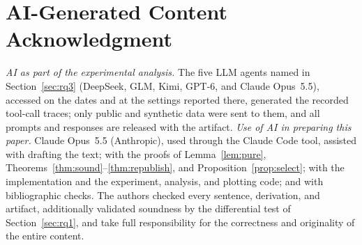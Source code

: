 \documentclass[sigconf, nonacm]{acmart}
\begin{document}
\section*{AI-Generated Content Acknowledgment}
\emph{AI as part of the experimental analysis.} The five LLM agents named in Section~\ref{sec:rq3} (DeepSeek, GLM, Kimi, GPT-6, and Claude Opus~5.5), accessed on the dates and at the settings reported there, generated the recorded tool-call traces; only public and synthetic data were sent to them, and all prompts and responses are released with the artifact.
\emph{Use of AI in preparing this paper.} Claude Opus~5.5 (Anthropic), used through the Claude Code tool, assisted with drafting the text; with the proofs of Lemma~\ref{lem:pure}, Theorems~\ref{thm:sound}--\ref{thm:republish}, and Proposition~\ref{prop:select}; with the implementation and the experiment, analysis, and plotting code; and with bibliographic checks. The authors checked every sentence, derivation, and artifact, additionally validated soundness by the differential test of Section~\ref{sec:rq1}, and take full responsibility for the correctness and originality of the entire content.



\end{document}
